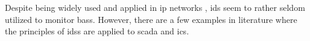 Despite being widely used and applied in \gls{ip} networks \parencite[cf.][pp.~201~ff.]{Northcutt2005}, \gls{ids} seem to rather seldom utilized to monitor \glspl{bas}.
However, there are a few examples in literature where the principles of \glspl{ids} are applied to \gls{scada} and \gls{ics}.

